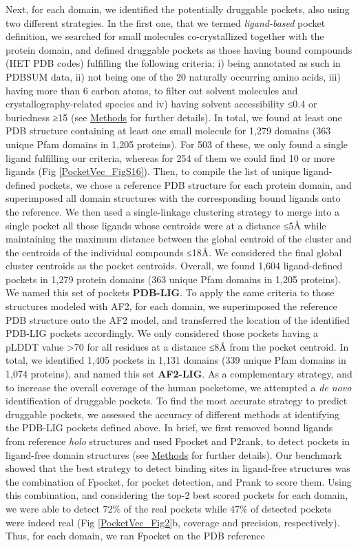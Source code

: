 Next, for each domain, we identified the potentially druggable pockets, also using two different strategies. In the first one, that we termed \textit{ligand-based} pocket definition, we searched for small molecules co-crystallized together with the protein domain, and defined druggable pockets as those having bound compounds (HET PDB codes) fulfilling the following criteria: i) being annotated as such in PDBSUM data, ii) not being one of the 20 naturally occurring amino acids, iii) having more than 6 carbon atoms, to filter out solvent molecules and crystallography-related species and iv) having solvent accessibility ≤0.4 or buriedness ≥15 (see \hyperref[PocketVec_Methods]{Methods} for further details). In total, we found at least one PDB structure containing at least one small molecule for 1,279 domains (363 unique Pfam domains in 1,205 proteins). For 503 of these, we only found a single ligand fulfilling our criteria, whereas for 254 of them we could find 10 or more ligands (Fig \ref{PocketVec_FigS16}). Then, to compile the list of unique ligand-defined pockets, we chose a reference PDB structure for each protein domain, and superimposed all domain structures with the corresponding bound ligands onto the reference. We then used a single-linkage clustering strategy to merge into a single pocket all those ligands whose centroids were at a distance ≤5Å while maintaining the maximum distance between the global centroid of the cluster and the centroids of the individual compounds ≤18Å. We considered the final global cluster centroids as the pocket centroids. Overall, we found 1,604 ligand-defined pockets in 1,279 protein domains (363 unique Pfam domains in 1,205 proteins). We named this set of pockets \textbf{PDB-LIG}. To apply the same criteria to those structures modeled with AF2, for each domain, we superimposed the reference PDB structure onto the AF2 model, and transferred the location of the identified PDB-LIG pockets accordingly. We only considered those pockets having a pLDDT value >70 for all residues at a distance ≤8Å from the pocket centroid. In total, we identified 1,405 pockets in 1,131 domains (339 unique Pfam domains in 1,074 proteins), and named this set \textbf{AF2-LIG}. As a complementary strategy, and to increase the overall coverage of the human pocketome, we attempted a \textit{de novo} identification of druggable pockets. To find the most accurate strategy to predict druggable pockets, we assessed the accuracy of different methods at identifying the PDB-LIG pockets defined above. In brief, we first removed bound ligands from reference \textit{holo} structures and used Fpocket\cite{le_guilloux_fpocket_2009} and P2rank\cite{krivak_p2rank_2018}, to detect pockets in ligand-free domain structures (see \hyperref[PocketVec_Methods]{Methods} for further details). Our benchmark showed that the best strategy to detect binding sites in ligand-free structures was the combination of Fpocket, for pocket detection, and Prank\cite{krivak_improving_2015} to score them. Using this combination, and considering the top-2 best scored pockets for each domain, we were able to detect 72\% of the real pockets while 47\% of detected pockets were indeed real (Fig \ref{PocketVec_Fig2}b, coverage and precision, respectively). Thus, for each domain, we ran Fpocket on the PDB reference 